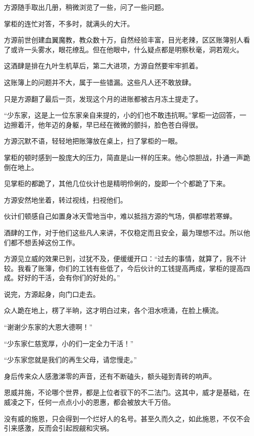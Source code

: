 \begin{this_body}
方源随手取出几册，稍微浏览了一些，问了一些问题。

掌柜的连忙对答，不多时，就满头的大汗。

方源前世创建血翼魔教，教众数十万，自然经验丰富，目光老辣，区区账簿别人看了或许一头雾水，眼花缭乱。但在他眼中，什么疑点都是明察秋毫，洞若观火。

这酒肆是排在九叶生机草后，第二大进项，方源自然要牢牢抓着。

这账簿上的问题并不大，属于一些错漏。这些凡人还不敢放肆。

只是方源翻了最后一页，发现这个月的进账都被古月冻土提走了。

“少东家，这是上一位东家亲自来提的，小的们也不敢违抗啊。”掌柜一边回答，一边擦着汗，他年迈的身躯，早已经在微微的颤抖，脸色苍白得很。

方源沉默不语，轻轻地把账簿放在桌上，扫了掌柜的一眼。

掌柜的顿时感到一股庞大的压力，简直是山一样的压来。他心惊胆战，扑通一声跪倒在地上。

见掌柜的都跪了，其他几位伙计也是精明伶俐的，旋即一个个都跪了下来。

方源安然地坐着，转过视线，扫视他们。

伙计们顿感自己如置身冰天雪地当中，难以抵挡方源的气场，俱都噤若寒蝉。

酒肆的工作，对于他们这些凡人来讲，不仅稳定而且安全，最为理想不过。所以他们都不想丢掉这份工作。

方源见立威的效果已到，过犹不及，便缓缓开口：“过去的事情，就算了，我不计较。我看了账簿，你们的工钱有些低了，今后伙计的工钱提高两成，掌柜的提高四成。好好的干活，会有你们的好处的。”

说完，方源起身，向门口走去。

众人跪在地上，楞了半晌，这才明白过来，各个泪水喷涌，在脸上横流。

“谢谢少东家的大恩大德啊！”

“少东家仁慈宽厚，小的们一定全力干活！”

“少东家您就是我们的再生父母，请您慢走。”

身后传来众人感激涕零的声音，还有不断磕头，额头碰到青砖的响声。

恩威并施，不论哪个世界，都是上位者驭下的不二法门。这其中，威才是基础，在威凌之下，任何一点点小小的恩惠，都会被放大千万倍。

没有威的施恩，只会得到一个烂好人的名号。甚至久而久之，如此施恩，不仅不会引来感激，反而会引起觊觎和灾祸。


\end{this_body}
